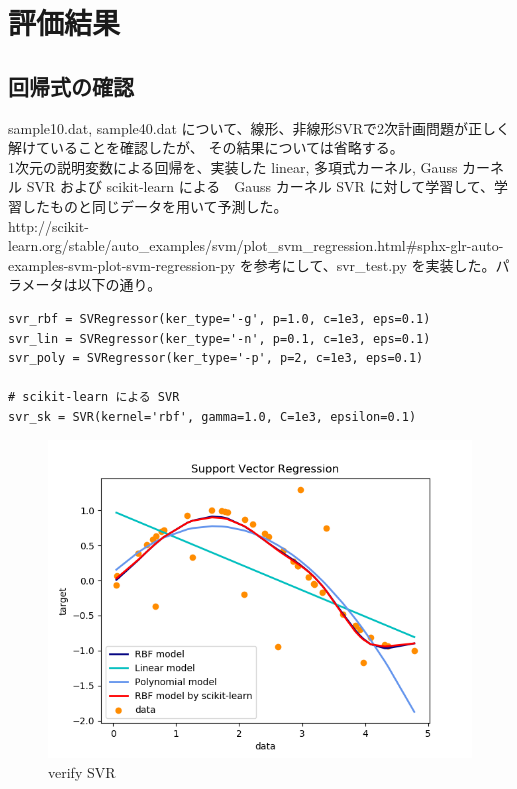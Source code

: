 \documentclass{jsarticle}
\begin{document}
\section{評価結果}
\subsection{回帰式の確認}
sample10.dat, sample40.dat について、線形、非線形SVRで2次計画問題が正しく解けていることを確認したが、
その結果については省略する。 \\
1次元の説明変数による回帰を、実装した linear, 多項式カーネル, Gauss カーネル SVR および scikit-learn による　Gauss カーネル SVR
に対して学習して、学習したものと同じデータを用いて予測した。 \\
http://scikit-learn.org/stable/auto\_examples/svm/plot\_svm\_regression.html\#sphx-glr-auto-examples-svm-plot-svm-regression-py
を参考にして、svr\_test.py を実装した。パラメータは以下の通り。
\begin{lstlisting}
svr_rbf = SVRegressor(ker_type='-g', p=1.0, c=1e3, eps=0.1)
svr_lin = SVRegressor(ker_type='-n', p=0.1, c=1e3, eps=0.1)
svr_poly = SVRegressor(ker_type='-p', p=2, c=1e3, eps=0.1)

# scikit-learn による SVR
svr_sk = SVR(kernel='rbf', gamma=1.0, C=1e3, epsilon=0.1)
\end{lstlisting}
\begin{figure}[!h]
\includegraphics[width=15cm]{svr_verify.png}
\caption{verify SVR}
\end{figure}
\end{document}
